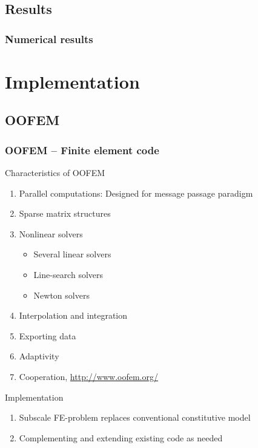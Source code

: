 \documentclass[11pt]{beamer} %
\begin{document}
\subsection{Results}
\begin{frame}
 \frametitle{Numerical results}
\begin{center}
\end{center}
\end{frame}

\section{Implementation}
\subsection{OOFEM}
\begin{frame}
 \frametitle{OOFEM -- Finite element code}
 Characteristics of OOFEM
 \begin{enumerate}
  \item<1-> Parallel computations: Designed for message passage paradigm
  \item<1-> Sparse matrix structures
  \item<1-> Nonlinear solvers
  \begin{itemize}
   \item<1-> Several linear solvers
   \item<1-> Line-search solvers
   \item<1-> Newton solvers
  \end{itemize}
  \item<1-> Interpolation and integration
  \item<1-> Exporting data
  \item<1-> Adaptivity
  \item<1-> Cooperation, \url{http://www.oofem.org/}
 \end{enumerate}

  Implementation
 \begin{enumerate}
  \item<2-> Subscale FE-problem replaces conventional constitutive model
  \item<2-> Complementing and extending existing code as needed
 \end{enumerate}

\end{frame}
\end{document}
